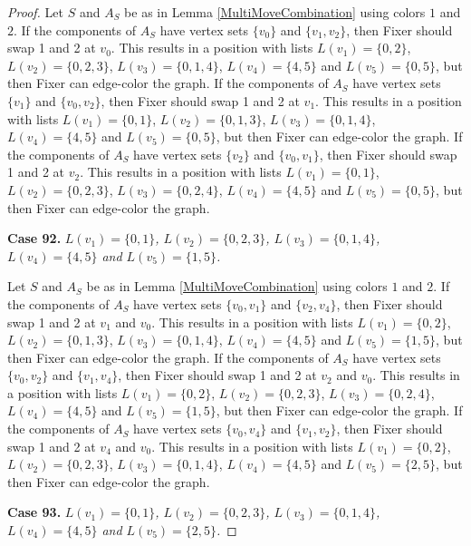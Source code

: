 \documentclass[12pt]{amsart}
\theoremstyle{plain}
\theoremstyle{definition}
\theoremstyle{remark}
\begin{document}
\begin{proof}
Let $S$ and $A_S$ be as in Lemma \ref{MultiMoveCombination} using colors $1$ and $2$. If the components of $A_S$ have vertex sets $\{v_0\}$ and $\{v_1, v_2\}$, then Fixer should swap 1 and 2 at $v_0$. This results in a position with lists $L(v_1) = \{0, 2\}$, $L(v_2) = \{0, 2, 3\}$, $L(v_3) = \{0, 1, 4\}$, $L(v_4) = \{4, 5\}$ and $L(v_5) = \{0, 5\}$, but then Fixer can edge-color the graph.
If the components of $A_S$ have vertex sets $\{v_1\}$ and $\{v_0, v_2\}$, then Fixer should swap 1 and 2 at $v_1$. This results in a position with lists $L(v_1) = \{0, 1\}$, $L(v_2) = \{0, 1, 3\}$, $L(v_3) = \{0, 1, 4\}$, $L(v_4) = \{4, 5\}$ and $L(v_5) = \{0, 5\}$, but then Fixer can edge-color the graph.
If the components of $A_S$ have vertex sets $\{v_2\}$ and $\{v_0, v_1\}$, then Fixer should swap 1 and 2 at $v_2$. This results in a position with lists $L(v_1) = \{0, 1\}$, $L(v_2) = \{0, 2, 3\}$, $L(v_3) = \{0, 2, 4\}$, $L(v_4) = \{4, 5\}$ and $L(v_5) = \{0, 5\}$, but then Fixer can edge-color the graph.

\noindent\textbf{Case 92.  }\textit{$L(v_1) = \{0, 1\}$, $L(v_2) = \{0, 2, 3\}$, $L(v_3) = \{0, 1, 4\}$, $L(v_4) = \{4, 5\}$ and $L(v_5) = \{1, 5\}$.}

Let $S$ and $A_S$ be as in Lemma \ref{MultiMoveCombination} using colors $1$ and $2$. If the components of $A_S$ have vertex sets $\{v_0, v_1\}$ and $\{v_2, v_4\}$, then Fixer should swap 1 and 2 at $v_1$ and $v_0$. This results in a position with lists $L(v_1) = \{0, 2\}$, $L(v_2) = \{0, 1, 3\}$, $L(v_3) = \{0, 1, 4\}$, $L(v_4) = \{4, 5\}$ and $L(v_5) = \{1, 5\}$, but then Fixer can edge-color the graph.
If the components of $A_S$ have vertex sets $\{v_0, v_2\}$ and $\{v_1, v_4\}$, then Fixer should swap 1 and 2 at $v_2$ and $v_0$. This results in a position with lists $L(v_1) = \{0, 2\}$, $L(v_2) = \{0, 2, 3\}$, $L(v_3) = \{0, 2, 4\}$, $L(v_4) = \{4, 5\}$ and $L(v_5) = \{1, 5\}$, but then Fixer can edge-color the graph.
If the components of $A_S$ have vertex sets $\{v_0, v_4\}$ and $\{v_1, v_2\}$, then Fixer should swap 1 and 2 at $v_4$ and $v_0$. This results in a position with lists $L(v_1) = \{0, 2\}$, $L(v_2) = \{0, 2, 3\}$, $L(v_3) = \{0, 1, 4\}$, $L(v_4) = \{4, 5\}$ and $L(v_5) = \{2, 5\}$, but then Fixer can edge-color the graph.

\noindent\textbf{Case 93.  }\textit{$L(v_1) = \{0, 1\}$, $L(v_2) = \{0, 2, 3\}$, $L(v_3) = \{0, 1, 4\}$, $L(v_4) = \{4, 5\}$ and $L(v_5) = \{2, 5\}$.}


\end{proof}
\end{document}
